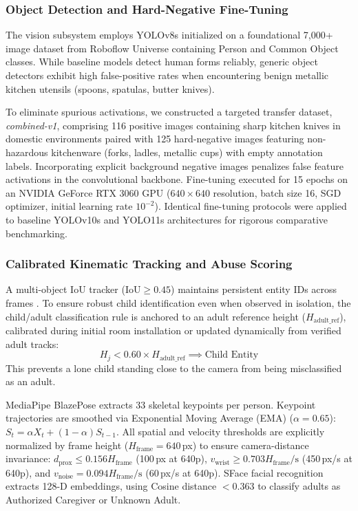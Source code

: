 \documentclass[conference]{IEEEtran}
\begin{document}
\subsubsection{Object Detection and Hard-Negative Fine-Tuning}
The vision subsystem employs YOLOv8s \cite{b18, b21} initialized on a foundational 7,000+ image dataset from Roboflow Universe containing Person and Common Object classes. While baseline models detect human forms reliably, generic object detectors exhibit high false-positive rates when encountering benign metallic kitchen utensils (spoons, spatulas, butter knives). 

To eliminate spurious activations, we constructed a targeted transfer dataset, \textit{combined-v1}, comprising 116 positive images containing sharp kitchen knives in domestic environments paired with 125 hard-negative images featuring non-hazardous kitchenware (forks, ladles, metallic cups) with empty annotation labels. Incorporating explicit background negative images penalizes false feature activations in the convolutional backbone. Fine-tuning executed for 15 epochs on an NVIDIA GeForce RTX 3060 GPU ($640 \times 640$ resolution, batch size 16, SGD optimizer, initial learning rate $10^{-2}$). Identical fine-tuning protocols were applied to baseline YOLOv10s and YOLO11s architectures for rigorous comparative benchmarking.

\subsubsection{Calibrated Kinematic Tracking and Abuse Scoring}
A multi-object IoU tracker ($\text{IoU} \ge 0.45$) maintains persistent entity IDs across frames \cite{b21}. To ensure robust child identification even when observed in isolation, the child/adult classification rule is anchored to an adult reference height ($H_{\text{adult\_ref}}$), calibrated during initial room installation or updated dynamically from verified adult tracks:
\begin{equation}
H_j < 0.60 \times H_{\text{adult\_ref}} \implies \text{Child Entity}
\end{equation}
This prevents a lone child standing close to the camera from being misclassified as an adult.

MediaPipe BlazePose \cite{b13} extracts 33 skeletal keypoints per person. Keypoint trajectories are smoothed via Exponential Moving Average (EMA) ($\alpha = 0.65$): $S_t = \alpha X_t + (1 - \alpha) S_{t-1}$. All spatial and velocity thresholds are explicitly normalized by frame height ($H_{\text{frame}} = 640$\,px) to ensure camera-distance invariance: $d_{\text{prox}} \le 0.156 H_{\text{frame}}$ (100\,px at 640p), $v_{\text{wrist}} \ge 0.703 H_{\text{frame}}/\text{s}$ (450\,px/s at 640p), and $v_{\text{noise}} = 0.094 H_{\text{frame}}/\text{s}$ (60\,px/s at 640p). SFace facial recognition \cite{b19} extracts 128-D embeddings, using Cosine distance $< 0.363$ to classify adults as Authorized Caregiver or Unknown Adult.
\end{document}
